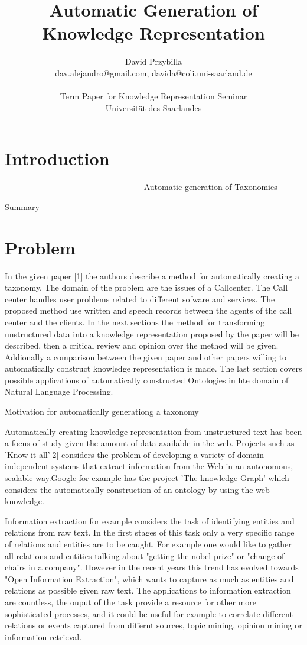 \documentclass[4pt,a4paper,twocolumn]{article}
\author{David Przybilla\\dav.alejandro@gmail.com, davida@coli.uni-saarland.de\\ \\ Term Paper for Knowledge Representation Seminar\\ Universit\"{a}t des Saarlandes}
\title{Automatic Generation of Knowledge Representation}
\begin{document}
\twocolumn[
	 \begin{@twocolumnfalse}
    \maketitle
  \end{@twocolumnfalse}
 ]




\section{Introduction}





--------------------------------------------------
Automatic generation of Taxonomies

Summary

\section{Problem}
In the given paper [1] the authors describe a method for automatically creating a taxonomy.
The domain of the problem are the issues of a Callcenter. The Call center handles user problems related to different sofware and services.
The proposed method use  written and speech records between the agents of the call center and the clients. 
In the next sections  the method for transforming unstructured data into a knowledge representation proposed by the paper will be described,
then a critical review and opinion over the method will be given. Addionally a comparison between the given paper and other papers willing to automatically construct knowledge representation is made.
The last section covers  possible applications of automatically constructed Ontologies in hte domain of Natural Language Processing.


Motivation for automatically generationg a taxonomy

Automatically creating knowledge representation from unstructured text has been a focus of study given the amount of data available in the web.
Projects such as 'Know it all'[2] considers the problem of developing a variety of domain-independent systems that extract information from the Web in an autonomous, scalable way.Google for example has the project 'The knowledge Graph' which considers the automatically construction of an ontology by using the web knowledge. 

Information extraction for example considers the task of identifying entities and relations from raw text.
In the first stages of this task only a very specific range of relations and entities are to be caught.
For example one would like to gather all relations and entities talking about  "getting the nobel prize" or "change of chairs in a company".
However in the recent years this trend has evolved towards "Open Information Extraction", which wants to capture as much as entities and relations as possible given raw text.
The applications to information extraction are countless, the ouput of the task provide a resource for other more sophisticated processes, and it could be useful for example to correlate different relations or events captured from differnt sources, topic mining, opinion mining or information retrieval.
\end{document}
